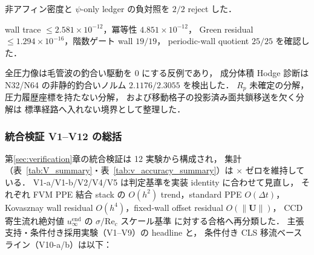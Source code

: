 \begin{description}
        非アフィン密度と $\psi$-only ledger の負対照を $2/2$ reject した．
  \item[U11（制約付き面速度状態空間；§\ref{sec:U11_constrained_face_state_space}）：]
        wall trace $\le2.581\times10^{-12}$，冪等性 $4.851\times10^{-12}$，
        Green residual $\le1.294\times10^{-16}$，階数ゲート wall $19/19$，
        periodic-wall quotient $25/25$ を確認した．
  \item[U12（アクティブ幾何毛管分解ゲート；§\ref{sec:U12_ao_capillary_split_gate}）：]
        全圧力像は毛管波の釣合い駆動を $0$ にする反例であり，
        成分体積 Hodge 診断は N32/N64 の非静的釣合いノルム
        $2.1176/2.3055$ を検出した．
        $R_p$ 未確定の分解，圧力履歴座標を持たない分解，
        および移動格子の投影済み面共鎖移送を欠く分解は
        標準経路へ入れない境界として整理した．
\end{description}

\subsubsection{統合検証 V1--V12 の総括}

第\ref{sec:verification}章の統合検証は 12 実験から構成され，
集計（表~\ref{tab:V_summary}・表~\ref{tab:v_accuracy_summary}）は $\times$ ゼロを維持している．
V1-a/V1-b/V2/V4/V5 は判定基準を実装 identity に合わせて見直し，
それぞれ FVM PPE 結合 stack の $O(h^2)$ trend，standard PPE $O(\Delta t)$，
Kovasznay wall residual $O(h^4)$，fixed-wall offset residual $O(\|\bm U\|)$，
CCD 寄生流れ絶対値 $u_\infty^{\mathrm{end}}$ の $\sigma/\mathrm{Re}_c$ スケール基準
に対する合格へ再分類した．
主張支持・条件付き採用実験（V1--V9）の headline と，
条件付き CLS 移流ベースライン（V10-a/b）は以下：

